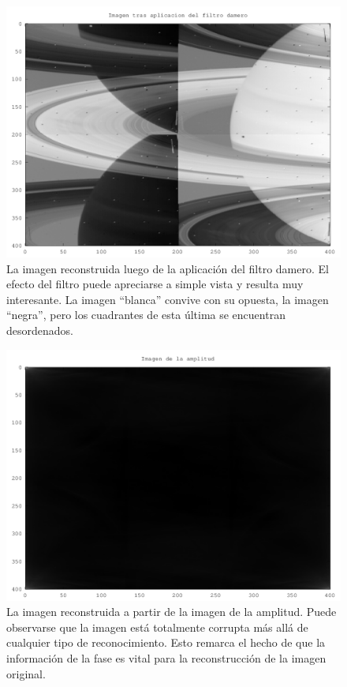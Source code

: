 \documentclass[twocolumn,a4paper,10pt]{article}
\begin{document}
\begin{figure}[H]
        \includegraphics[width=\linewidth]{../images/dameroFilter.png}
        \caption{La imagen reconstruida luego de la aplicaci\'on del filtro damero. El efecto del filtro puede apreciarse a simple vista y resulta muy interesante.
        La imagen ``blanca'' convive con su opuesta, la imagen ``negra'', pero los cuadrantes de esta última se encuentran desordenados.}
        \label{fig:dameroFilter}
\end{figure}

\begin{figure}[H]
        \includegraphics[width=\linewidth]{../images/amplitudeRebuilt.png}
        \caption{La imagen reconstruida a partir de la imagen de la amplitud. Puede observarse que la imagen est\'a totalmente corrupta m\'as all\'a 
        de cualquier tipo de reconocimiento. Esto remarca el hecho de que la informaci\'on de la fase es vital para la reconstrucci\'on de la imagen original.}
        \label{fig:amplitudeRebuilt}
\end{figure}
\end{document}
